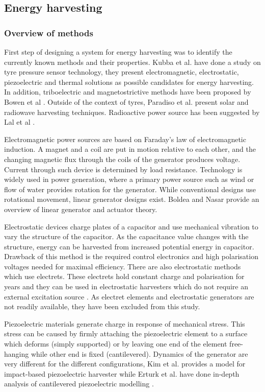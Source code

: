\subsection{Energy harvesting}
\subsubsection{Overview of methods}
First step of designing a system for energy harvesting was to identify the currently known methods and their properties. Kubba et al. \cite{Kubba2014} have done a study on tyre pressure sensor technology, they present electromagnetic, electrostatic, piezoelectric and thermal solutions as possible candidates for energy harvesting. In addition, triboelectric and magnetostrictive methods have been proposed by Bowen et al \cite{Bowen2014}. Outside of the context of tyres, Paradiso et al. \cite{Paradiso2005} present solar and radiowave harvesting techniques. Radioactive power source has been suggested by Lal et al \cite{Lal2004}. 

Electromagnetic power sources are based on Faraday's law of electromagnetic induction. A magnet and a coil are put in motion relative to each other, and the changing magnetic flux through the coils of the generator produces voltage. Current through such device is determined by load resistance. Technology is widely used in power generation, where a primary power source such as wind or flow of water provides rotation for the generator. While conventional designs use rotational movement, linear generator designs exist. Boldea and Nasar \cite{Boldea1999} provide an overview of linear generator and actuator theory. 

Electrostatic devices charge plates of a capacitor and use mechanical vibration to vary the structure of the capacitor. As the capacitance value changes with the structure, energy can be harvested from increased potential energy in capacitor. Drawback of this method is the required control electronics and high polarisation voltages needed for maximal efficiency. There are also electrostatic methods which use electrets. These electrets hold constant charge and polarisation for years and they can be used in electrostatic harvesters which do not require an external excitation source \cite{Boisseau2012}. As electret elements and electrostatic generators are not readily available, they have been excluded from this study.

Piezoelectric materials generate charge in response of mechanical stress. This stress can be caused by firmly attaching the piezoelectric element to a surface which deforms (simply supported) or by leaving one end of the element free-hanging while other end is fixed (cantilevered). Dynamics of the generator are very different for the different configurations, Kim et al. \cite{Kim2014a} provides a model for impact-based piezoelectric harvester while Erturk et al. have done in-depth analysis of cantilevered piezoelectric modelling \cite{Erturk2009}. 

